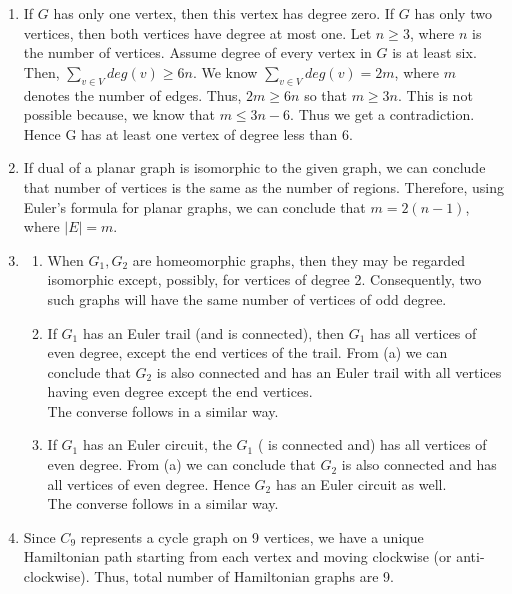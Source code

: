 \documentclass{article}
\begin{document}
\begin{enumerate}
\item  If $G$ has only one vertex, then this vertex has degree zero. If $G$ has only two vertices, then both vertices have degree at most one. Let $n \geq 3$, where $n$ is the number of vertices. Assume degree of every vertex in $G$ is at least six. Then, $\sum_{v\in V}deg(v) \geq 6n$. We know $\sum_{v\in V}deg (v)=2m$, where $m$ denotes the number of edges. Thus, $2m\geq 6n$ so that $m\geq 3n$. This is not possible because, we know that  $m \leq 3n - 6$. Thus we get a contradiction. Hence G has at least one vertex of degree less than 6. 



\item  If dual of a planar graph is isomorphic to the given graph, we can conclude that number of vertices is the same as the number of regions. Therefore, using Euler's formula for planar graphs, we can conclude that $m=2(n-1)$, where $|E|=m$.


\item 
\begin{enumerate}
\item When $G_1, G_2$ are homeomorphic graphs, then they may be regarded isomorphic except, possibly, for vertices of degree 2. Consequently, two such graphs will have the same number of vertices of odd degree. 

\item If $G_1$ has an Euler trail (and is connected), then $G_1$ has all vertices of even degree, except the end vertices of the trail. From (a) we can conclude that $G_2$ is also connected and has an Euler trail with all vertices having even degree except the end vertices.\\
The converse follows in a similar way.

\item If $G_1$ has an Euler circuit, the $G_1$ ( is connected and) has all vertices of even degree. From (a) we can conclude that $G_2$ is also connected and  has all vertices of even degree. Hence $G_2$ has an Euler circuit as well. \\
The converse follows in a similar way.
\end{enumerate}


\item  Since $C_9$ represents a cycle graph on 9 vertices, we have a unique Hamiltonian path starting from each vertex and moving clockwise (or anti-clockwise). Thus, total number of Hamiltonian graphs are 9.   




\end{enumerate}
\end{document}

